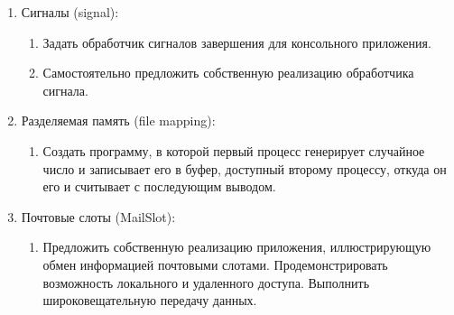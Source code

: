 \begin{enumerate}
	\item Сигналы (signal):
		\begin{enumerate}
			\item Задать обработчик сигналов завершения для консольного приложения.
			\item Самостоятельно предложить собственную реализацию обработчика сигнала.
		\end{enumerate}
	\item Разделяемая память (file mapping):
		\begin{enumerate}
			\item Создать программу, в которой первый процесс генерирует случайное число и записывает его в буфер, доступный второму процессу, откуда он его и считывает с последующим выводом.
		\end{enumerate}
	\item Почтовые слоты (MailSlot):
		\begin{enumerate}
			\item Предложить собственную реализацию приложения, иллюстрирующую обмен информацией почтовыми слотами. Продемонстрировать возможность локального и удаленного доступа. Выполнить широковещательную передачу данных.
		\end{enumerate}
\end{enumerate}